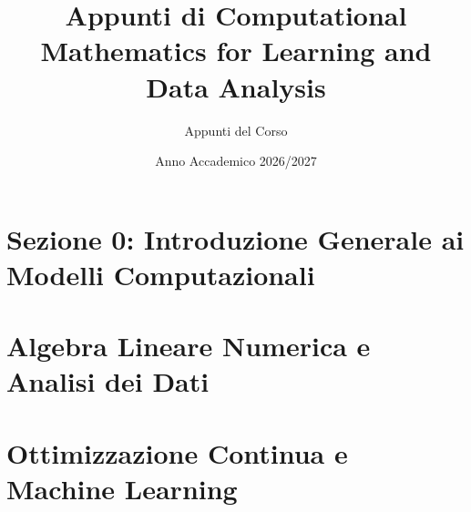 \documentclass[12pt,a4paper,oneside]{report}
\title{\textbf{Appunti di Computational Mathematics for Learning and Data Analysis}}
\author{Appunti del Corso}
\date{Anno Accademico 2026/2027}
\begin{document}
\maketitle
\tableofcontents

\clearpage
{}

\cleardoublepage
{}
{}
\part*{Sezione 0: Introduzione Generale ai Modelli Computazionali}
\setcounter{chapter}{-1}


\part{Algebra Lineare Numerica e Analisi dei Dati}







\part{Ottimizzazione Continua e Machine Learning}







\clearpage
\begingroup
\sloppy
{}
{}


\endgroup
\end{document}
